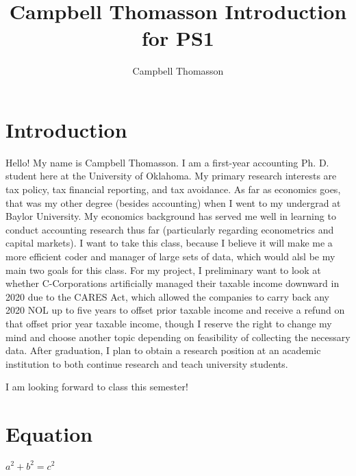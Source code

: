 \documentclass{article}
\title{Campbell Thomasson Introduction for PS1}
\author{Campbell Thomasson}
\begin{document}
\maketitle

\section{Introduction}

Hello! My name is Campbell Thomasson. I am a first-year accounting Ph. D. student here at the University of Oklahoma. My primary research interests are tax policy, tax financial reporting, and tax avoidance. As far as economics goes, that was my other degree (besides accounting) when I went to my undergrad at Baylor University. My economics background has served me well in learning to conduct accounting research thus far (particularly regarding econometrics and capital markets). I want to take this class, because I believe it will make me a more efficient coder and manager of large sets of data, which would alsl be my main two goals for this class. For my project, I preliminary want to look at whether C-Corporations artificially managed their taxable income downward in 2020 due to the CARES Act, which allowed the companies to carry back any 2020 NOL up to five years to offset prior taxable income and receive a refund on that offset prior year taxable income, though I reserve the right to change my mind and choose another topic depending on feasibility of collecting the necessary data. After graduation, I plan to obtain a research position at an academic institution to both continue research and teach university students.

I am looking forward to class this semester!

\section{Equation}

\(a^2 + b^2 = c^2\)
\end{document}
